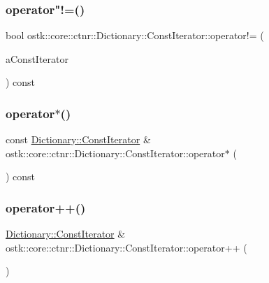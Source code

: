 \subsubsection{\texorpdfstring{operator"!=()}{operator!=()}}
{\footnotesize\ttfamily bool ostk\+::core\+::ctnr\+::\+Dictionary\+::\+Const\+Iterator\+::operator!= (\begin{DoxyParamCaption}\item[{const \hyperlink{classostk_1_1core_1_1ctnr_1_1_dictionary_1_1_const_iterator}{Const\+Iterator} \&}]{a\+Const\+Iterator }\end{DoxyParamCaption}) const}

\mbox{\label{classostk_1_1core_1_1ctnr_1_1_dictionary_1_1_const_iterator_a184e1799637eb915d1a05acc962faaa4}} 
\subsubsection{\texorpdfstring{operator$\ast$()}{operator*()}}
{\footnotesize\ttfamily const \hyperlink{classostk_1_1core_1_1ctnr_1_1_dictionary_1_1_const_iterator}{Dictionary\+::\+Const\+Iterator} \& ostk\+::core\+::ctnr\+::\+Dictionary\+::\+Const\+Iterator\+::operator$\ast$ (\begin{DoxyParamCaption}{ }\end{DoxyParamCaption}) const}

\mbox{\label{classostk_1_1core_1_1ctnr_1_1_dictionary_1_1_const_iterator_a987d4aa2a55050dd7aec162421fa532c}} 
\subsubsection{\texorpdfstring{operator++()}{operator++()}\hspace{0.1cm}{\footnotesize\ttfamily [1/2]}}
{\footnotesize\ttfamily \hyperlink{classostk_1_1core_1_1ctnr_1_1_dictionary_1_1_const_iterator}{Dictionary\+::\+Const\+Iterator} \& ostk\+::core\+::ctnr\+::\+Dictionary\+::\+Const\+Iterator\+::operator++ (\begin{DoxyParamCaption}{ }\end{DoxyParamCaption})}

